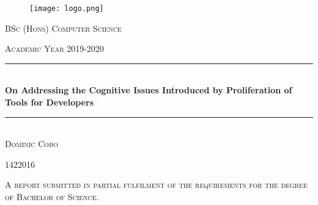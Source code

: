 \documentclass[a4paper, 11pt]{report}
\newcommand{\fypCourse}{BSc (Hons) Computer Science}
\newcommand{\fypStudent}{Dominic Cobo}
\newcommand{\fypStudentId}{1422016}
\newcommand{\fypAcademicYear}{2019-2020}
\newcommand{\fypTitle}{On Addressing the Cognitive Issues Introduced by Proliferation of Tools for Developers}
\begin{document}
	\begin{titlepage}
		\centering
		\begin{figure}
			\texttt{[image: logo.png]}
		\end{figure}
		\textsc{\LARGE \fypCourse}
		
		\textsc{\large Academic Year \fypAcademicYear}
		
		\rule{\linewidth}{0.5mm} \\[0.5cm]
		{ \huge\textbf { \fypTitle } } \\
		\rule{\linewidth}{0.5mm} \\[6cm]
		
		
		\textsc{\huge \fypStudent}
		
		\textsc{\large \fypStudentId}
		
		\bigskip
		
		\textsc{\large A report submitted in partial fulfilment of the requirements for the degree of Bachelor of Science.}
		
	\end{titlepage}
	
	\newpage
	
	
	
	
	
	
	
	
	
	\printbibliography
	
\end{document}
